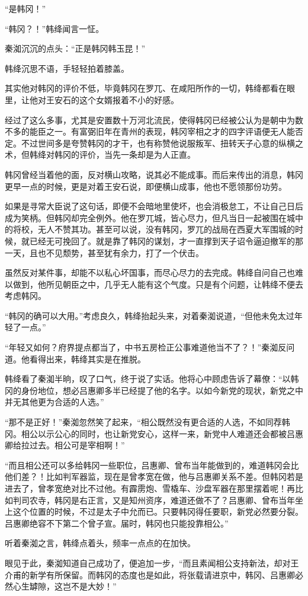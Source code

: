 “是韩冈！”

“韩冈？！”韩绛闻言一怔。

秦洳沉沉的点头：“正是韩冈韩玉昆！”

韩绛沉思不语，手轻轻拍着膝盖。

其实他对韩冈的评价不低，毕竟韩冈在罗兀、在咸阳所作的一切，韩绛都看在眼里，让他对王安石的这个女婿报着不小的好感。

经过了这么多事，尤其是安置数十万河北流民，使得韩冈已经被公认为是朝中为数不多的能臣之一。有富弼旧年在青州的表现，韩冈宰相之才的四字评语便无人能否定。不过世间多是夸赞韩冈的才干，也有称赞他说服叛军、扭转天子心意的纵横之术，但韩绛对韩冈的评价，当先一条却是为人正直。

韩冈曾经当着他的面，反对横山攻略，说其必不能成事。而后来传出的消息，韩冈更早一点的时候，更是对着王安石说，即便横山成事，他也不愿领那份功劳。

如果是寻常大臣说了这句话，即便不会暗地里使坏，也会消极怠工，不让自己日后成为笑柄。但韩冈却完全例外。他在罗兀城，皆心尽力，但凡当日一起被围在城中的将校，无人不赞其功。甚至可以说，没有韩冈，罗兀的战局在西夏大军围城的时候，就已经无可挽回了。就是靠了韩冈的谋划，才一直撑到天子诏令逼迫撤军的那一天，且也不见颓势，甚至犹有余力，打了一个伏击。

虽然反对某件事，却能不以私心坏国事，而尽心尽力的去完成。韩绛自问自己也难以做到，他所见朝臣之中，几乎无人能有这个气度。只是有个问题，让韩绛不便去考虑韩冈。

“韩冈的确可以大用。”考虑良久，韩绛抬起头来，对着秦洳说道，“但他未免太过年轻了一点。”

“年轻又如何？府界提点都当了，中书五房检正公事难道他当不了？！”秦洳反问道。他看得出来，韩绛其实是在推脱。

韩绛看了秦洳半晌，叹了口气，终于说了实话。他将心中顾虑告诉了幕僚：“以韩冈的身份地位，想必吕惠卿多半已经提了他的名字。以如今新党的现状，新党之中并无其他更为合适的人选。”

“那不是正好！”秦洳忽然笑了起来，“相公既然没有更合适的人选，不如同荐韩冈。相公以示公心的同时，也让新党安心，这样一来，新党中人难道还会都被吕惠卿给拉过去。相公可是宰相啊！”

“而且相公还可以多给韩冈一些职位，吕惠卿、曾布当年能做到的，难道韩冈会比他们差？！比如判军器监，现在是曾孝宽在做，他与吕惠卿关系不差。但韩冈若是进去了，曾孝宽绝对比不过他。有霹雳炮、雪橇车、沙盘军器在那里摆着呢！再比如判司农寺，韩冈是右正言，又是知州资序，难道还做不了？吕惠卿、曾布当年坐上这个位置的时候，不过是太子中允而已。只要韩冈得任要职，新党必然要分裂。吕惠卿绝容不下第二个曾子宣。届时，韩冈也只能投靠相公。”

听着秦洳之言，韩绛点着头，频率一点点的在加快。

眼见于此，秦洳知道自己成功了，便追加一步，“而且素闻相公支持新法，却对王介甫的新学有所保留。而韩冈的态度也是如此，将张载请进京中，韩冈、吕惠卿必然心生罅隙，这岂不是大妙！”

